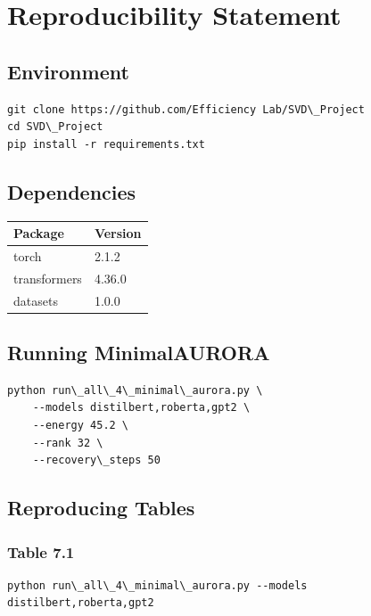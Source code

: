 \section{Reproducibility Statement}

\subsection{Environment}

\begin{lstlisting}
git clone https://github.com/Efficiency Lab/SVD\_Project
cd SVD\_Project
pip install -r requirements.txt
\end{lstlisting}

\subsection{Dependencies}

\begin{table}[H]
\centering
\small
\begin{tabular}{ll}
\toprule
\textbf{Package} & \textbf{Version} \\
\midrule
torch & 2.1.2 \\
transformers & 4.36.0 \\
datasets & 1.0.0 \\
\bottomrule
\end{tabular}
\end{table}

\subsection{Running MinimalAURORA}

\begin{lstlisting}
python run\_all\_4\_minimal\_aurora.py \
    --models distilbert,roberta,gpt2 \
    --energy 45.2 \
    --rank 32 \
    --recovery\_steps 50
\end{lstlisting}

\subsection{Reproducing Tables}

\subsubsection{Table 7.1}
\begin{lstlisting}
python run\_all\_4\_minimal\_aurora.py --models distilbert,roberta,gpt2
\end{lstlisting}

